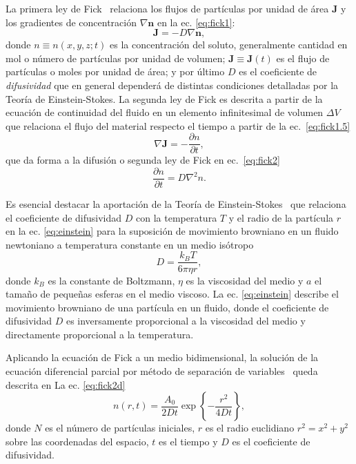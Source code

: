 \documentclass{article}[13pt]
\begin{document}
La primera ley de Fick~\cite{gilExperimentosFisicaUsando2014} relaciona los flujos de partículas por unidad de área $\mathbf{J}$ y los gradientes de concentración $\nabla \mathbf{n}$ en la ec. \ref{eq:fick1}:
\begin{equation}
    \mathbf{J} = -D \nabla \mathbf{n},
    \label{eq:fick1}
\end{equation}
donde $n\equiv n(x,y,z;t)$ es la concentración del soluto, generalmente cantidad en mol o número de partículas por unidad de volumen; $\mathbf{J}\equiv\mathbf{J}(t)$ es el flujo de partículas o moles por unidad de área; y por último $D$ es el coeficiente de \textit{difusividad} que en general dependerá de distintas condiciones  detalladas por la Teoría de Einstein-Stokes.
La segunda ley de Fick es descrita a partir de la ecuación de continuidad del fluido en un elemento infinitesimal de volumen $\Delta V$ que relaciona el flujo del material respecto el tiempo a partir de la ec.~\ref{eq:fick1.5}
\begin{equation}
    \nabla \mathbf{J} = -\frac{\partial n}{\partial t},
    \label{eq:fick1.5}
\end{equation}
que da forma a la difusión o segunda ley de Fick en ec.~\ref{eq:fick2}
\begin{equation}
    \frac{\partial n}{\partial t} = D \nabla^2 n.
    \label{eq:fick2}
\end{equation}

Es esencial destacar la aportación de la Teoría de Einstein-Stokes~\cite{einsteinUberMolekularkinetischenTheorie1905} que relaciona el coeficiente de difusividad $D$ con la temperatura $T$ y el radio de la partícula $r$ en la ec. \ref{eq:einstein} para la suposición de movimiento browniano en un fluido newtoniano a temperatura constante en un medio isótropo~\cite{leeInkDifussionWater2004}
\begin{equation}
    D = \frac{k_B T}{6 \pi \eta r},
    \label{eq:einstein}
\end{equation}
donde $k_B$ es la constante de Boltzmann, $\eta$ es la viscosidad del medio y $a$ el tamaño de pequeñas esferas en el medio viscoso. La ec. \ref{eq:einstein} describe el movimiento browniano de una partícula en un fluido, donde el coeficiente de difusividad $D$ es inversamente proporcional a la viscosidad del medio y directamente proporcional a la temperatura.

Aplicando la ecuación de Fick a un medio bidimensional, la solución de la ecuación diferencial parcial por método de separación de variables~\cite{gilExperimentosFisicaUsando2014} queda descrita en La ec. \ref{eq:fick2d}
\begin{equation}
    n(r,t) = \frac{A_0}{2 D t} \exp{\left\{-\frac{r^2}{4Dt}\right\}},
    \label{eq:fick2d}
\end{equation}
donde $N$ es el número de partículas iniciales, $r$ es el radio euclidiano $r^2 = x^2 + y^2$ sobre las coordenadas del espacio, $t$ es el tiempo y $D$ es el coeficiente de difusividad. 
\end{document}
